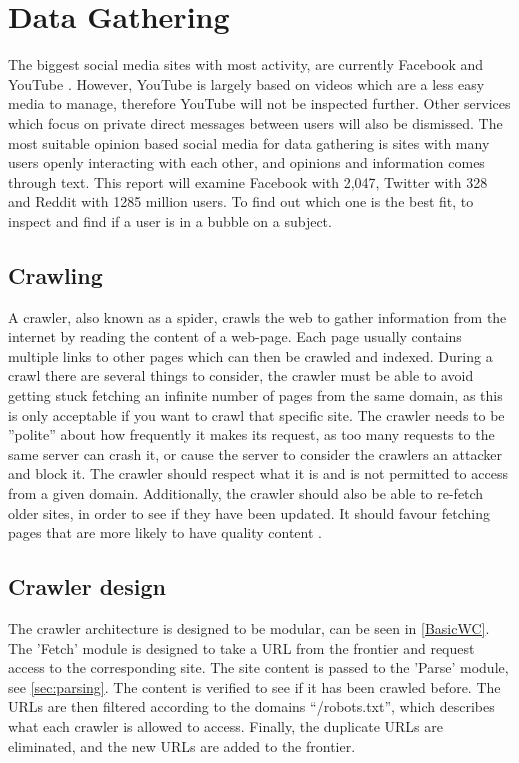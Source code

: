 \section{Data Gathering}
The biggest social media sites with most activity, are currently Facebook and
YouTube \citep{SocialMediaStats}.
However, YouTube is largely based on videos which are a less easy media to
manage, therefore YouTube will not be inspected further. Other services which
focus on private direct messages between users will also be dismissed. The most
suitable opinion based social media for data gathering is sites with many users
openly interacting with each other, and opinions and information comes through
text. This report will examine Facebook with 2,047, Twitter with 328 and
Reddit with 1285 million users. To find out which one is the best fit, to inspect and
find if a user is in a bubble on a subject.

\subsection{Crawling}
A crawler, also known as a spider, crawls the web to gather information from the
internet by reading the content of a web-page. Each page usually contains
multiple links to other pages which can then be crawled and indexed. During a
crawl there are several things to consider, the crawler must be able to avoid
getting stuck fetching an infinite number of pages from the same domain, as this
is only acceptable if you want to crawl that specific site. The crawler needs to
be ''polite'' about how frequently it makes its request, as too many requests to
the same server can crash it, or cause the server to consider the crawlers an
attacker and block it. The crawler should respect what it is and is not
permitted to access from a given domain. Additionally, the crawler should also
be able to re-fetch older sites, in order to see if they have been updated. It
should favour fetching pages that are more likely to have quality content
\citep[Ch. 20.1]{manning2008introduction}.\nl

\subsection{Crawler design}%
The crawler architecture is designed to be modular, can be seen in
\autoref{BasicWC}. The 'Fetch' module is designed to take a URL from the
frontier and request access to the corresponding site. The site content is
passed to the 'Parse' module, see \autoref{sec:parsing}.
The content is verified to see if it has been crawled before. The URLs are then
filtered according to the domains ``/robots.txt'', which describes what each
crawler is allowed to access. Finally, the duplicate URLs are eliminated, and
the new URLs are added to the frontier.

